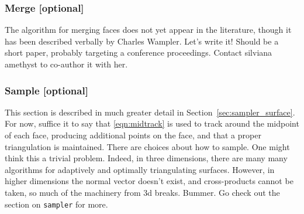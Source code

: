 \subsubsection{Merge [optional]}

The algorithm for merging faces does not yet appear in the literature, though it has been described verbally by Charles Wampler.  Let's write it!  Should be a short paper, probably targeting a conference proceedings.  Contact silviana amethyst to co-author it with her.


\subsubsection{Sample [optional]}
This section is described in much greater detail in Section~\ref{sec:sampler_surface}.  For now, suffice it to say that \eqref{eqn:midtrack} is used to track around the midpoint of each face, producing additional points on the face, and that a proper triangulation is maintained.  There are choices about how to sample.  One might think this a trivial problem.  Indeed, in three dimensions, there are many many algorithms for adaptively and optimally triangulating surfaces.  However, in higher dimensions the normal vector doesn't exist, and cross-products cannot be taken, so much of the machinery from 3d breaks.  Bummer.  Go check out the section on {\tt sampler} for more.

